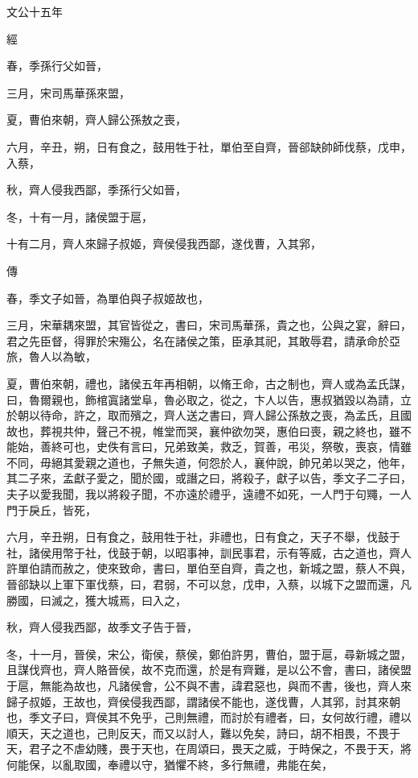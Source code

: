 \documentclass{ctexart}
\begin{document}
文公十五年


經



春，季孫行父如晉，

三月，宋司馬華孫來盟，

夏，曹伯來朝，齊人歸公孫敖之喪，

六月，辛丑，朔，日有食之，鼓用牲于社，單伯至自齊，晉郤缺帥師伐蔡，戊申，入蔡，

秋，齊人侵我西鄙，季孫行父如晉，

冬，十有一月，諸侯盟于扈，

十有二月，齊人來歸子叔姬，齊侯侵我西鄙，遂伐曹，入其郛，

傳



春，季文子如晉，為單伯與子叔姬故也，

三月，宋華耦來盟，其官皆從之，書曰，宋司馬華孫，貴之也，公與之宴，辭曰，君之先臣督，得罪於宋殤公，名在諸侯之策，臣承其祀，其敢辱君，請承命於亞旅，魯人以為敏，

夏，曹伯來朝，禮也，諸侯五年再相朝，以脩王命，古之制也，齊人或為孟氏謀，曰，魯爾親也，飾棺寘諸堂阜，魯必取之，從之，卞人以告，惠叔猶毀以為請，立於朝以待命，許之，取而殯之，齊人送之書曰，齊人歸公孫敖之喪，為孟氏，且國故也，葬視共仲，聲己不視，帷堂而哭，襄仲欲勿哭，惠伯曰喪，親之終也，雖不能始，善終可也，史佚有言曰，兄弟致美，救乏，賀善，弔災，祭敬，喪哀，情雖不同，毋絕其愛親之道也，子無失道，何怨於人，襄仲說，帥兄弟以哭之，他年，其二子來，孟獻子愛之，聞於國，或譖之曰，將殺子，獻子以告，季文子二子曰，夫子以愛我聞，我以將殺子聞，不亦遠於禮乎，遠禮不如死，一人門于句鼆，一人門于戾丘，皆死，

六月，辛丑朔，日有食之，鼓用牲于社，非禮也，日有食之，天子不舉，伐鼓于社，諸侯用幣于社，伐鼓于朝，以昭事神，訓民事君，示有等威，古之道也，齊人許單伯請而赦之，使來致命，書曰，單伯至自齊，貴之也，新城之盟，蔡人不與，晉郤缺以上軍下軍伐蔡，曰，君弱，不可以怠，戊申，入蔡，以城下之盟而還，凡勝國，曰滅之，獲大城焉，曰入之，

秋，齊人侵我西鄙，故季文子告于晉，

冬，十一月，晉侯，宋公，衛侯，蔡侯，鄭伯許男，曹伯，盟于扈，尋新城之盟，且謀伐齊也，齊人賂晉侯，故不克而還，於是有齊難，是以公不會，書曰，諸侯盟于扈，無能為故也，凡諸侯會，公不與不書，諱君惡也，與而不書，後也，齊人來歸子叔姬，王故也，齊侯侵我西鄙，謂諸侯不能也，遂伐曹，人其郛，討其來朝也，季文子曰，齊侯其不免乎，己則無禮，而討於有禮者，曰，女何故行禮，禮以順天，天之道也，己則反天，而又以討人，難以免矣，詩曰，胡不相畏，不畏于天，君子之不虐幼賤，畏于天也，在周頌曰，畏天之威，于時保之，不畏于天，將何能保，以亂取國，奉禮以守，猶懼不終，多行無禮，弗能在矣，
\end{document}
